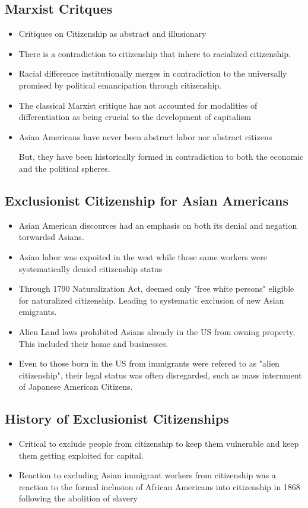 \documentclass{article}
\begin{document}
\subsection{Marxist Critques}
\begin{itemize}
  \item Critiques on Citizenship as abstract and illusionary
  \item There is a contradiction to citizenship
    that inhere to racialized citizenship.
  \item Racial difference institutionally merges in contradiction
    to the universally promised by political emancipation
    through citizenship.
  \item The classical Marxist critique has not accounted for modalities of
    differentiation as being crucial to the development of capitalism
  \item Asian Americans have never been abstract labor nor abstract citizens

    But, they have been historically formed in contradiction
    to both the economic and the political spheres.
\end{itemize}

\subsection{Exclusionist Citizenship for Asian Americans}

\begin{itemize}
  \item Asian American discources had an emphasis on both
    its denial and negation torwardsd Asians.
  \item Asian labor was expoited in the west while those
    same workers were systematically denied citizenship status
  \item Through 1790 Naturalization Act, deemed only "free white persons"
    eligible for naturalized citizenship. Leading to
    systematic exclusion of new Asian emigrants.
  \item Alien Land laws prohibited Asians already in the US
    from owning property. This included their home and businesses.
  \item Even to those born in the US from immigrants were refered to as
    "alien citizenship", their legal status was often disregarded,
    such as mass internment of Japanese American Citizens.
\end{itemize}

\subsection{History of Exclusionist Citizenships}
\begin{itemize}
  \item Critical to exclude people from citizenship to keep them
    vulnerable and keep them getting exploited for capital.
  \item Reaction to excluding Asian immigrant workers from citizenship
    was a reaction to the formal inclusion of African Americans
    into citizenship in 1868 following the abolition of slavery
\end{itemize}
\end{document}
